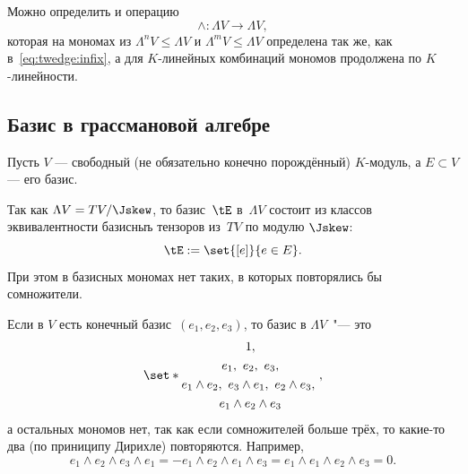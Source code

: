 Можно определить и операцию
\[
	\wedge \colon
	\Lambda V \to \Lambda V
	,
\]
которая на мономах из $\Lambda^n V \leq \Lambda V$ и $\Lambda^m V \leq \Lambda V$ определена так же, как в~\eqref{eq:twedge:infix}, а для $K$-линейных комбинаций мономов продолжена по $K$-линейности.


\subsection{Базис в грассмановой алгебре}

Пусть $V$ --- свободный (не обязательно конечно порождённый) $K$-модуль, а $E \subset V$ --- его базис.

Так как $\Lambda V = TV / \Jskew$, то базис~$\tE$ в~$\Lambda V$ состоит из классов эквивалентности базисныъ тензоров из~$TV$ по модулю $\Jskew$:
\[
	\tE :=
	\set{[e]}{e \in E}
	.
\]
При этом в базисных мономах нет таких, в которых повторялись бы сомножители.

\begin{example}
	Если в $V$ есть конечный базис~$(e_1, e_2, e_3)$, то базис в $\Lambda V$~"--- это
	\[
		\set*{
			\begin{gathered}
				1,\\
				e_1,\ e_2,\ e_3,
				\\
				e_1 \wedge e_2,\ 
				e_3 \wedge e_1,\   
				e_2 \wedge e_3,\   
				\\
				e_1 \wedge e_2 \wedge e_3
			\end{gathered}
		}
		,
	\]
	а остальных мономов нет, так как если сомножителей больше трёх, то какие-то два (по приниципу Дирихле) повторяются. Например,
	\[
		e_1 \wedge e_2 \wedge e_3 \wedge e_1 =
		-
		e_1 \wedge e_2 \wedge e_1 \wedge e_3 =
		e_1 \wedge e_1 \wedge e_2 \wedge e_3 =
		0
		.
	\]
\end{example}

